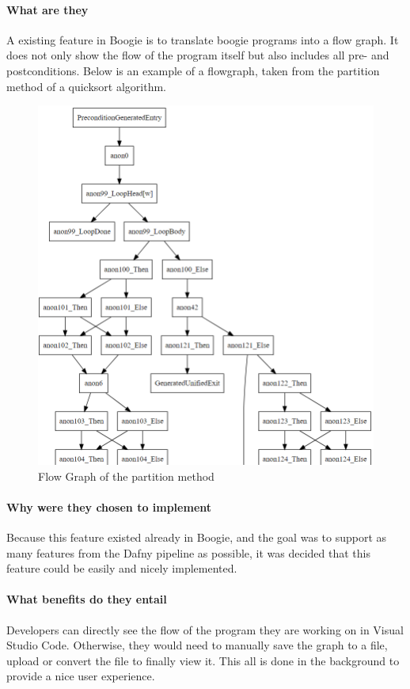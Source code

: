 \paragraph{What are they}
A existing feature in Boogie is to translate boogie programs into a flow graph. It does not only show the flow of the program itself but also includes all pre- and postconditions. Below is an example of a flowgraph, taken from the partition method of a quicksort algorithm.\newline  
\begin{figure}[H]
	\centering
	\includegraphics[width=1.0\textwidth]{img/flowgraph}
	\caption{Flow Graph of the partition method}
	\label{fig:flowgraph}
\end{figure}
\paragraph{Why were they chosen to implement}
Because this feature existed already in Boogie, and the goal was to support as many features from the Dafny pipeline as possible, it was decided that this feature could be easily and nicely implemented. 
\paragraph{What benefits do they entail}
Developers can directly see the flow of the program they are working on in Visual Studio Code. Otherwise, they would need to manually save the graph to a file, upload or convert the file to finally view it. This all is done in the background to provide a nice user experience.
